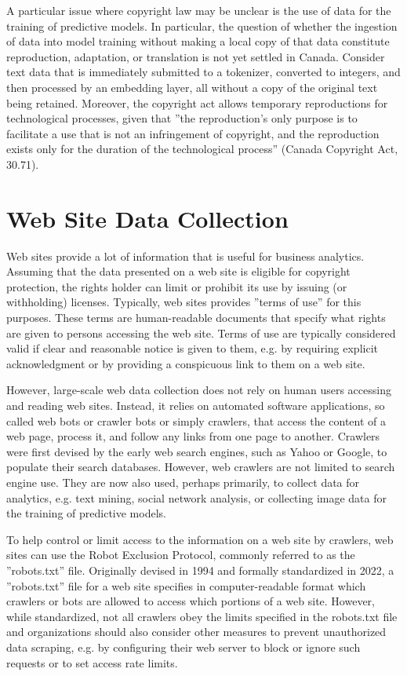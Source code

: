 A particular issue where copyright law may be unclear is the use of data for the training of predictive models. In particular, the question of whether the ingestion of data into model training without making a local copy of that data constitute reproduction, adaptation, or translation is not yet settled in Canada. Consider text data that is immediately submitted to a tokenizer, converted to integers, and then processed by an embedding layer, all without a copy of the original text being retained. Moreover, the copyright act allows temporary reproductions for technological processes, given that ''the reproduction's only purpose is to facilitate a use that is not an infringement of copyright, and the reproduction exists only for the duration of the technological process'' (Canada Copyright Act, 30.71).

\section{Web Site Data Collection}

Web sites provide a lot of information that is useful for business analytics. Assuming that the data presented on a web site is eligible for copyright protection, the rights holder can limit or prohibit its use by issuing (or withholding) licenses. Typically, web sites provides ''terms of use'' for this purposes. These terms are human-readable documents that specify what rights are given to persons accessing the web site. Terms of use are typically considered valid if clear and reasonable notice is given to them, e.g. by requiring explicit acknowledgment or by providing a conspicuous link to them on a web site. 

However, large-scale web data collection does not rely on human users accessing and reading web sites. Instead, it relies on automated software applications, so called web bots or crawler bots or simply crawlers, that access the content of a web page, process it, and follow any links from one page to another. Crawlers were first devised by the early web search engines, such as Yahoo or Google, to populate their search databases. However, web crawlers are not limited to search engine use. They are now also used, perhaps primarily, to collect data for analytics, e.g. text mining, social network analysis, or collecting image data for the training of predictive models. 

To help control or limit access to the information on a web site by crawlers, web sites can use the Robot Exclusion Protocol, commonly referred to as the ''robots.txt'' file. Originally devised in 1994 and formally standardized in 2022, a ''robots.txt'' file for a web site specifies in computer-readable format which crawlers or bots are allowed to access which portions of a web site. However, while standardized, not all crawlers obey the limits specified in the robots.txt file and organizations should also consider other measures to prevent unauthorized data scraping, e.g. by configuring their web server to block or ignore such requests or to set access rate limits. 

